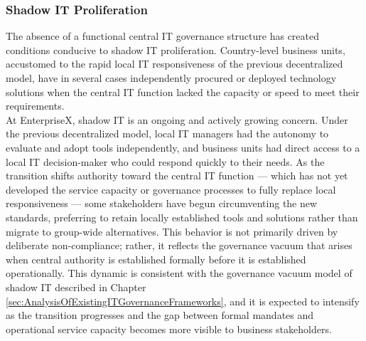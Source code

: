 \subsubsection{Shadow IT Proliferation}
\label{subsubsec:ShadowITProlif}
The absence of a functional central IT governance structure has created conditions conducive to shadow IT proliferation.
Country-level business units, accustomed to the rapid local IT responsiveness of the previous decentralized model, have in several cases independently procured or deployed technology solutions when the central IT function lacked the capacity or speed to meet their requirements.
\\
At EnterpriseX, shadow IT is an ongoing and actively growing concern.
Under the previous decentralized model, local IT managers had the autonomy to evaluate and adopt tools independently, and business units had direct access to a local IT decision-maker who could respond quickly to their needs.
As the transition shifts authority toward the central IT function — which has not yet developed the service capacity or governance processes to fully replace local responsiveness — some stakeholders have begun circumventing the new standards, preferring to retain locally established tools and solutions rather than migrate to group-wide alternatives.
This behavior is not primarily driven by deliberate non-compliance; rather, it reflects the governance vacuum that arises when central authority is established formally before it is established operationally.
This dynamic is consistent with the governance vacuum model of shadow IT described in Chapter \ref{sec:AnalysisOfExistingITGovernanceFrameworks}, and it is expected to intensify as the transition progresses and the gap between formal mandates and operational service capacity becomes more visible to business stakeholders.

